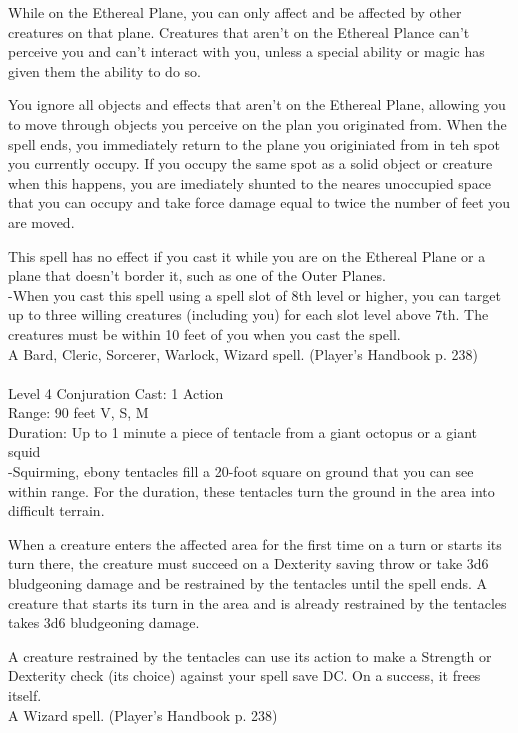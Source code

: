 \documentclass[10pt,twocolumn]{report}
\begin{document}
While on the Ethereal Plane, you can only affect and be affected by other creatures on that plane. Creatures that aren’t on the Ethereal Plance can’t perceive you and can’t interact with you, unless a special ability or magic has given them the ability to do so. 

You ignore all objects and effects that aren’t on the Ethereal Plane, allowing you to move through objects you perceive on the plan you originated from. When the spell ends, you immediately return to the plane you originiated from in teh spot you currently occupy. If you occupy the same spot as a solid object or creature when this happens, you are imediately shunted to the neares unoccupied space that you can occupy and take force damage equal to twice the number of feet you are moved. 

This spell has no effect if you cast it while you are on the Ethereal Plane or a plane that doesn’t border it, such as one of the Outer Planes.\\
-When you cast this spell using a spell slot of 8th level or higher, you can target up to three willing creatures (including you) for each slot level above 7th. The creatures must be within 10 feet of you when you cast the spell.\\
A Bard, Cleric, Sorcerer, Warlock, Wizard spell. (Player's Handbook p. 238) \\


 \\
Level 4 \quad Conjuration \quad Cast: 1 Action\\
Range: 90 feet \quad V, S, M\\
Duration: Up to 1 minute \quad a piece of tentacle from a giant octopus or a giant squid\\
-Squirming, ebony tentacles fill a 20-foot square on ground that you can see within range. For the duration, these tentacles turn the ground in the area into difficult terrain. 

When a creature enters the affected area for the first time on a turn or starts its turn there, the creature must succeed on a Dexterity saving throw or take 3d6 bludgeoning damage and be restrained by the tentacles until the spell ends. A creature that starts its turn in the area and is already restrained by the tentacles takes 3d6 bludgeoning damage. 

A creature restrained by the tentacles can use its action to make a Strength or Dexterity check (its choice) against your spell save DC. On a success, it frees itself.\\
A Wizard spell. (Player's Handbook p. 238) \\
\end{document}
